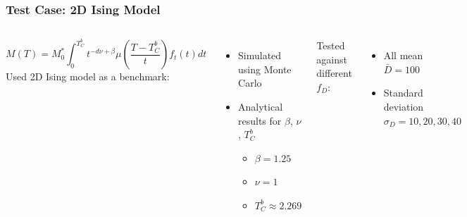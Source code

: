 \documentclass{beamer}
\begin{document}
\begin{frame}
	\frametitle{Test Case: 2D Ising Model}
	\begin{columns}
	\column{7cm}
		\small{
		$$
		M(T) = M_0^*\int_0^{T_C^b} t^{-d\nu +\beta} \mu\left(\frac{T-T_C^b}{t}\right) f_t(t) dt
		$$}
		Used 2D Ising model as a benchmark:
		\begin{itemize}
			\item{Simulated using Monte Carlo}
			\item{Analytical results for $\beta$, $\nu$, $T_C^b$}
			\begin{itemize}
				\item{$\beta = 1.25$}
				\item{$\nu=1$}
				\item{$T_C^b \approx 2.269$}
			\end{itemize}
		\end{itemize} \vspace{4mm}
		
		Tested against different $f_D$:
		\begin{itemize}
			\item{All mean $\bar{D}=100$}
			\item{Standard deviation $\sigma_D=10, 20, 30 ,40$}
		\end{itemize}
	\column{5cm}
		\includegraphics[width=4.5cm]{Images/distros}
		
		\includegraphics[width=4.5cm]{Images/unconst}
	\end{columns}
\end{frame}
\end{document}
